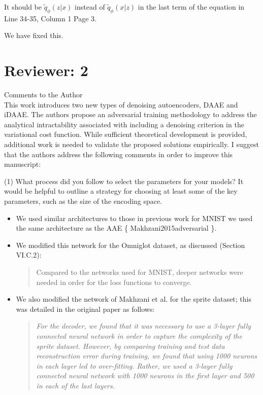 \documentclass[a4paper,11pt]{article}
\begin{document}
{\color{blue}
It should be $\tilde q_\phi(z|x)$ instead of $\tilde q_\phi(x|z)$ in the last term of the equation in Line 34-35, Column 1 Page 3. }\newline

We have fixed this.

\section{Reviewer: 2}

Comments to the Author
{\color{blue}\\
This work introduces two new types of denoising autoencoders, DAAE and iDAAE. The authors propose an adversarial training methodology to address the analytical intractability associated with including a denoising criterion in the variational cost function. While sufficient theoretical development is provided, additional work is needed to validate the proposed solutions empirically. I suggest that the authors address the following comments in order to improve this manuscript:}\newline

{\color{blue}
(1) What process did you follow to select the parameters for your models? It would be helpful to outline a strategy for choosing at least some of the key parameters, such as the size of the encoding space. }\newline
\begin{itemize}
    \item We used similar architectures to those in previous work for MNIST we used the same architecture as the AAE \{ Makhzani2015adversarial \}.
    \item We modified this network for the Omniglot dataset, as discussed (Section VI.C.2):
    \begin{quote}
        Compared  to  the  networks  used  for  MNIST,  deeper networks  were  needed  in  order  for  the  loss  functions  to converge.
    \end{quote}
    \item We also modified the network of Makhzani et al. for the sprite dataset; this was detailed in the original paper as follows:
    \begin{quote}
        {\it
        For  the  decoder,  we  found  that  it  was  necessary  to  use  a 3-layer  fully  connected  neural  network  in  order  to  capture the  complexity  of  the  sprite  dataset.  However,  by  comparing training and test data reconstruction error during training, we found that using 1000 neurons in each layer led to over-fitting. Rather, we used a 3-layer fully connected neural network with 1000 neurons  in  the  first  layer  and 500 in  each  of  the  last layers.}
    \end{quote}
    
\end{itemize}
\end{document}
